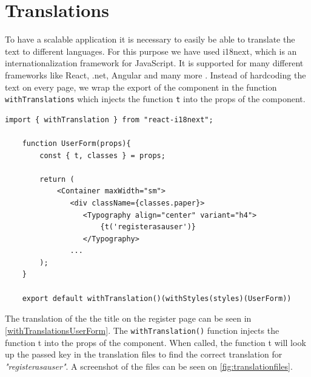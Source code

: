 \section{Translations}
To have a scalable application it is necessary to easily be able to translate the text to different languages.
For this purpose we have used i18next, which is an internationalization framework for JavaScript.
It is supported for many different frameworks like React, .net, Angular and many more \cite{i18next}.
Instead of hardcoding the text on every page, we wrap the export of the component in the function \texttt{withTranslations} which injects the function \texttt{t} into the props of the component.  

\begin{lstlisting}[caption={Translated header when registering as a user.}, captionpos=b, label={withTranslationsUserForm}]
    import { withTranslation } from "react-i18next";

    function UserForm(props){
        const { t, classes } = props;

        return (
            <Container maxWidth="sm">
               <div className={classes.paper}>
                  <Typography align="center" variant="h4">
                      {t('registerasauser')}
                  </Typography>
               ...
        );
    }

    export default withTranslation()(withStyles(styles)(UserForm))
\end{lstlisting}
\noindent
The translation of the the title on the register page can be seen in \autoref{withTranslationsUserForm}.
The \texttt{withTranslation()} function injects the function t into the props of the component.
When called, the function t will look up the passed key in the translation files to find the correct translation for  \textit{"registerasauser"}. 
A screenshot of the files can be seen on \autoref{fig:translationfiles}.
